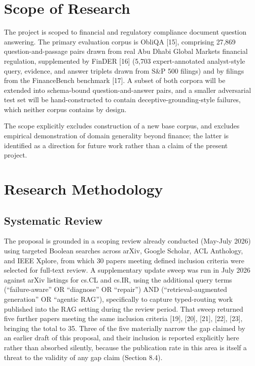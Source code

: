 \documentclass[11pt,a4paper]{article}
\begin{document}
\section{Scope of Research}

The project is scoped to financial and regulatory compliance document question answering.
The primary evaluation corpus is ObliQA [15], comprising 27,869 question-and-passage pairs
drawn from real Abu Dhabi Global Markets financial regulation, supplemented by FinDER [16]
(5,703 expert-annotated analyst-style query, evidence, and answer triplets drawn from
S\&P 500 filings) and by filings from the FinanceBench benchmark [17]. A subset of both
corpora will be extended into schema-bound question-and-answer pairs, and a smaller
adversarial test set will be hand-constructed to contain deceptive-grounding-style
failures, which neither corpus contains by design.

The scope explicitly excludes construction of a new base corpus, and excludes empirical
demonstration of domain generality beyond finance; the latter is identified as a
direction for future work rather than a claim of the present project.

\section{Research Methodology}

\subsection{Systematic Review}

The proposal is grounded in a scoping review already conducted (May-July 2026) using
targeted Boolean searches across arXiv, Google Scholar, ACL Anthology, and IEEE Xplore,
from which 30 papers meeting defined inclusion criteria were selected for full-text
review. A supplementary update sweep was run in July 2026 against arXiv listings for
cs.CL and cs.IR, using the additional query terms (``failure-aware'' OR ``diagnose'' OR
``repair'') AND (``retrieval-augmented generation'' OR ``agentic RAG''), specifically to
capture typed-routing work published into the RAG setting during the review period. That
sweep returned five further papers meeting the same inclusion criteria [19], [20], [21],
[22], [23], bringing the total to 35. Three of the five materially narrow the gap claimed
by an earlier draft of this proposal, and their inclusion is reported explicitly here
rather than absorbed silently, because the publication rate in this area is itself a
threat to the validity of any gap claim (Section 8.4).
\end{document}
